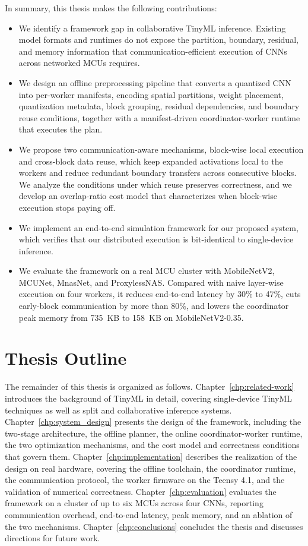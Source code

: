 In summary, this thesis makes the following contributions:
\begin{itemize}
  \item We identify a framework gap in collaborative TinyML inference. Existing model formats and runtimes do not expose the partition, boundary, residual, and memory information that communication-efficient execution of CNNs across networked MCUs requires.
  \item We design an offline preprocessing pipeline that converts a quantized CNN into per-worker manifests, encoding spatial partitions, weight placement, quantization metadata, block grouping, residual dependencies, and boundary reuse conditions, together with a manifest-driven coordinator-worker runtime that executes the plan.
  \item We propose two communication-aware mechanisms, block-wise local execution and cross-block data reuse, which keep expanded activations local to the workers and reduce redundant boundary transfers across consecutive blocks. We analyze the conditions under which reuse preserves correctness, and we develop an overlap-ratio cost model that characterizes when block-wise execution stops paying off.
  \item We implement an end-to-end simulation framework for our proposed system, which verifies that our distributed execution is bit-identical to single-device inference.
  \item We evaluate the framework on a real MCU cluster with MobileNetV2, MCUNet, MnasNet, and ProxylessNAS. Compared with naive layer-wise execution on four workers, it reduces end-to-end latency by 30\% to 47\%, cuts early-block communication by more than 80\%, and lowers the coordinator peak memory from 735~KB to 158~KB on MobileNetV2-0.35.
\end{itemize}

\section{Thesis Outline}
\label{sec:intro-thesis-outline}
The remainder of this thesis is organized as follows. Chapter~\ref{chp:related-work} introduces the background of TinyML in detail, covering single-device TinyML techniques as well as split and collaborative inference systems. Chapter~\ref{chp:system_design} presents the design of the framework, including the two-stage architecture, the offline planner, the online coordinator-worker runtime, the two optimization mechanisms, and the cost model and correctness conditions that govern them. Chapter~\ref{chp:implementation} describes the realization of the design on real hardware, covering the offline toolchain, the coordinator runtime, the communication protocol, the worker firmware on the Teensy 4.1, and the validation of numerical correctness. Chapter~\ref{chp:evaluation} evaluates the framework on a cluster of up to six MCUs across four CNNs, reporting communication overhead, end-to-end latency, peak memory, and an ablation of the two mechanisms. Chapter~\ref{chp:conclusions} concludes the thesis and discusses directions for future work.